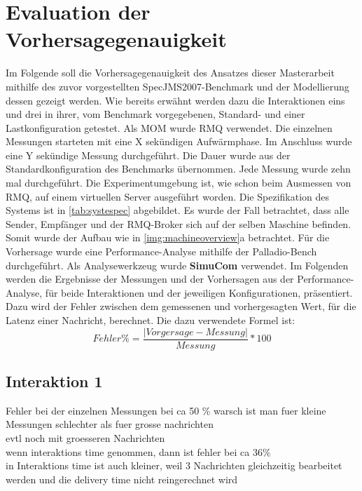 \section{Evaluation der Vorhersagegenauigkeit}
Im Folgende soll die Vorhersagegenauigkeit des Ansatzes dieser Masterarbeit mithilfe des zuvor vorgestellten SpecJMS2007-Benchmark und der Modellierung dessen gezeigt werden. Wie bereits erwähnt werden dazu die Interaktionen eins und drei in ihrer, vom Benchmark vorgegebenen, Standard- und einer Lastkonfiguration getestet. Als MOM wurde RMQ verwendet. Die einzelnen Messungen starteten mit eine X sekündigen Aufwärmphase. Im Anschluss wurde eine Y sekündige Messung durchgeführt. Die Dauer wurde aus der Standardkonfiguration des Benchmarks übernommen. Jede Messung wurde zehn mal durchgeführt. Die Experimentumgebung ist, wie schon beim Ausmessen von RMQ, auf einem virtuellen Server ausgeführt worden. Die Spezifikation des Systems ist in \autoref{tab:systespec} abgebildet. Es wurde der Fall betrachtet, dass alle Sender, Empfänger und der RMQ-Broker sich auf der selben Maschine befinden. Somit wurde der Aufbau wie in \autoref{img:machineoverview}a betrachtet. Für die Vorhersage wurde eine Performance-Analyse mithilfe der Palladio-Bench durchgeführt. Als Analysewerkzeug wurde \textbf{SimuCom} verwendet. Im Folgenden werden die Ergebnisse der Messungen und der Vorhersagen aus der Performance-Analyse, für beide Interaktionen und der jeweiligen Konfigurationen, präsentiert. Dazu wird der Fehler zwischen dem gemessenen und vorhergesagten Wert, für die Latenz einer Nachricht, berechnet. Die dazu verwendete Formel ist:
\[ Fehler\% = \frac{|Vorgersage - Messung|}{Messung} * 100 \]
\subsection{Interaktion 1}
Fehler bei der einzelnen Messungen bei ca 50 \% warsch ist man fuer kleine Messungen schlechter als fuer grosse nachrichten \\
evtl noch mit groesseren Nachrichten \\
wenn interaktions time genommen, dann ist fehler bei ca 36\% \\
in Interaktions time ist auch kleiner, weil 3 Nachrichten gleichzeitig bearbeitet werden und die delivery time nicht reingerechnet wird

